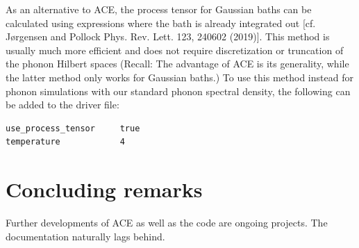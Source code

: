 \documentclass{scrartcl}
\begin{document}
As an alternative to ACE, the process tensor for Gaussian baths can be 
calculated using expressions where the bath is already integrated out
[cf. {J{\o}rgensen and Pollock} Phys. Rev. Lett. 123, 240602 (2019)]. 
This method is usually much more 
efficient and does not require discretization or truncation of the phonon
Hilbert spaces (Recall: The advantage of ACE is its generality, while 
the latter method only works for Gaussian baths.)
To use this method instead for phonon simulations with our standard 
phonon spectral density, the following can be added to the driver file:

\begin{verbatim}
use_process_tensor     true
temperature            4
\end{verbatim}

\section{Concluding remarks}
Further developments of ACE as well as the code are ongoing projects.
The documentation naturally lags behind. 
\end{document}
